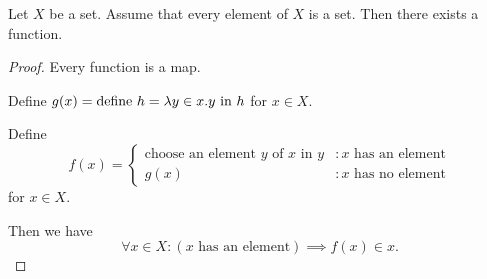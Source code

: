 \documentclass{article}
\begin{document}
  \begin{forthel}
    \begin{proposition}
      Let $X$ be a set.
      Assume that every element of $X$ is a set.
      Then there exists a function.
    \end{proposition}
    \begin{proof}
      Every function is a map.

      Define $g(x) = \text{define $h = \mathrm{\lambda} y \in x. y$ in $h$}$ for $x \in X$.

      Define \[ f(x) =
        \begin{cases}
          \text{choose an element $y$ of $x$ in $y$} & : \text{$x$ has an element} \\
          g(x)                                       & : \text{$x$ has no element}
        \end{cases} \]
      for $x \in X$.

      Then we have
      \[ \forall x \in X: (\text{$x$ has an element}) \implies f(x) \in x. \]
    \end{proof}
  \end{forthel}
\end{document}
